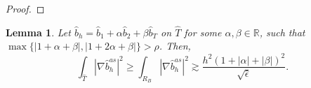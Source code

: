 \documentclass{article}
\newtheorem{lemma}[thm]{Lemma}
\newcommand{\rz}{\mathbb{R}}
\newcommand{\nsep}{\ensuremath{n\sqrt{\epsilon}}}
\newcommand{\hatT}{\ensuremath{{\hat{T}}}}
\newcommand{\hatb}{\ensuremath{\hat{b}}}
\begin{document}
\begin{appendix}
\begin{proof}



\end{proof}




\begin{lemma}
\label{Lemma:bubble_bound_inf_1}
Let $\hatb_h= \hatb_1 + \alpha \hatb_2 + \beta \hatb_T$ on $\hatT$ for some $\alpha,\beta\in \rz$, such that 
$\max\{|1+\alpha+\beta|,|1+2\alpha+\beta|\}>\rho$.
Then,
\begin{equation*}
\int_{\hatT}|\nabla \hatb_h^{as}|^2 
\ge
\int_{R_B}|\nabla \hatb_h^{as}|^2 
\gtrsim
    \frac{h^2(1+|\alpha|+|\beta|)^2}{\sqrt{\hat{\epsilon}}}.
\end{equation*} 


\end{lemma}
\end{appendix}
\end{document}
